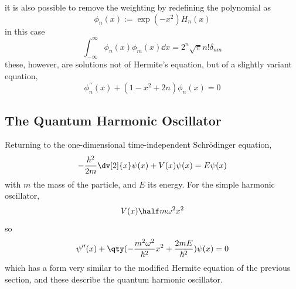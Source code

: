 it is also possible to remove the weighting by redefining the polynomial as
\[ \phi_n(x) := \exp(-x^2) H_n(x) \]
in this case
\begin{equation}
  \label{eq:hermiteorthonoweight}
  \int_{-\infty}^{\infty} \phi_n(x) \phi_m(x) \dd{x} = 2^n \sqrt{\pi} n! \delta_{nm}
\end{equation}
these, however, are solutions not of Hermite's equation, but of a slightly variant equation,
\begin{equation}
  \label{eq:modhermiteequation}
  \phi^{\prime \prime}_n(x) + (1-x^2+2n) \phi_n(x) = 0 
\end{equation}

\subsection{The Quantum Harmonic Oscillator}
\label{sec:quant-harm-oscill}

Returning to the one-dimensional time-independent Schr\"odinger
equation,
\begin{equation}
  \label{eq:1}
  - \frac{\hbar^2}{2m} \dv[2]{x} \psi(x) + V(x) \psi(x) = E \psi(x)
\end{equation}
with $m$ the mass of the particle, and $E$ its energy. For the simple harmonic oscillator, 
\[ V(x) \half m \omega^2 x^2 \]
so
\[ \psi^{\prime \prime} (x) + \qty( - \frac{m^2 \omega^2}{\hbar^2} x^2
+ \frac{2m E}{\hbar^2} ) \psi(x) = 0 \] which has a form very similar
to the modified Hermite equation of the previous section, and these
describe the quantum harmonic oscillator.

